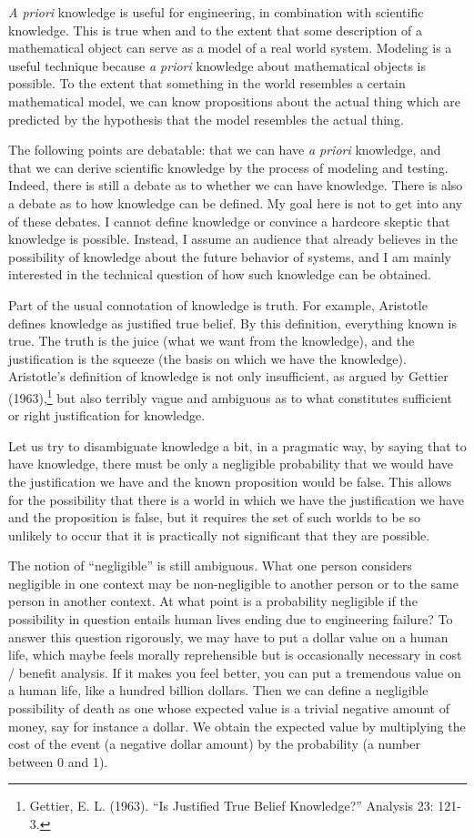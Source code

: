 \documentclass[11pt]{article}
\begin{document}
\emph{A priori}\/ knowledge is useful for engineering, in combination with scientific
knowledge. This is true when and to the extent that some description of a mathematical object
can serve as a model of a real world system. Modeling is a useful technique because
\emph{a priori}\/ knowledge about mathematical objects is possible. To the extent
that something in the world resembles a certain mathematical model, we can know propositions
about the actual thing which are predicted by the hypothesis that the model resembles
the actual thing.

The following points are debatable: that we can have
\emph{a priori}\/ knowledge, and that we can derive scientific knowledge by the process
of modeling and testing. Indeed, there is still a debate as to whether we can have knowledge.
There is also a debate as to how knowledge can be defined. My goal here is not to get
into any of these debates. I cannot define knowledge or convince a hardcore skeptic
that knowledge is possible. Instead, I assume an audience that already believes in the
possibility of knowledge about the future behavior of systems, and I am mainly interested in
the technical question of how such knowledge can be obtained.

Part of the usual connotation of knowledge is truth. For example, Aristotle defines knowledge
as justified true belief. By this definition, everything known is true. The truth is the
juice (what we want from the knowledge), and the justification is the squeeze (the basis
on which we have the knowledge). Aristotle's definition of knowledge is not only
insufficient, as argued by Gettier (1963),\footnote{Gettier, E. L. (1963).
``Is Justified True Belief Knowledge?'' Analysis 23: 121-3.}
but also terribly vague and ambiguous as to what constitutes sufficient or
right justification for knowledge.

Let us try to disambiguate knowledge a bit, in a pragmatic way, by saying that to
have knowledge, there must be only a negligible probability that we would have the
justification we have and the known proposition would be false. This allows for the
possibility that there is a world in which we have the justification we have and the
proposition is false, but it requires the set of such worlds to be so unlikely to occur
that it is practically not significant that they are possible.

The notion of ``negligible'' is still ambiguous. What one person considers negligible
in one context may be non-negligible to another person or to the same person in another
context. At what point is a probability negligible if the possibility in question entails
human lives ending due to engineering failure? To answer this question rigorously, we may have
to put a dollar value on a human life, which maybe feels morally reprehensible but
is occasionally necessary in cost / benefit analysis. If it makes you feel better,
you can put a tremendous value on a human life, like a hundred billion dollars.
Then we can define a negligible possibility of death as one whose expected value
is a trivial negative amount of money,
say for instance a dollar. We obtain the expected value by multiplying the cost of the
event (a negative dollar amount) by the probability (a number between 0 and 1).
\end{document}

